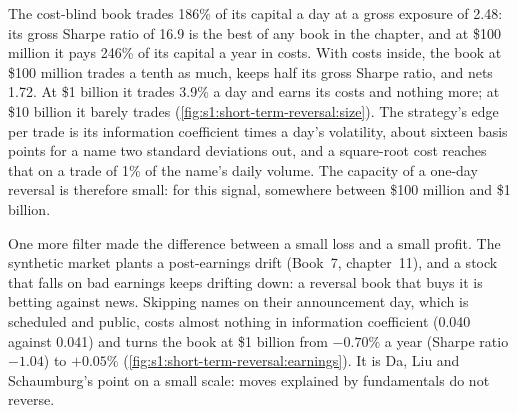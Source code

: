 The cost-blind book trades 186\% of its capital a day at a gross exposure of 2.48: its gross Sharpe ratio of 16.9 is the best of any book in the chapter, and
at \$100 million it pays 246\% of its capital a year in costs. With costs inside, the book at \$100 million trades a tenth as much, keeps half its gross
Sharpe ratio, and nets 1.72. At \$1 billion it trades 3.9\% a day and earns its costs and nothing more; at \$10 billion it barely trades
(\cref{fig:s1:short-term-reversal:size}). The strategy's edge per trade is its information coefficient times a day's volatility, about sixteen basis
points for a name two standard deviations out, and a square-root cost reaches that on a trade of 1\% of the name's daily volume. The capacity of a one-day
reversal is therefore small: for this signal, somewhere between \$100 million and \$1 billion.

\begin{omfigure}

\label{fig:s1:short-term-reversal:size}
\end{omfigure}

One more filter made the difference between a small loss and a small profit. The synthetic market plants a post-earnings drift (Book~7, chapter~11), and a
stock that falls on bad earnings keeps drifting down: a reversal book that buys it is betting against news. Skipping names on their announcement day, which
is scheduled and public, costs almost nothing in information coefficient (0.040 against 0.041) and turns the book at \$1 billion from $-0.70\%$ a year
(Sharpe ratio $-1.04$) to $+0.05\%$ (\cref{fig:s1:short-term-reversal:earnings}). It is Da, Liu and Schaumburg's point on a small scale: moves explained by
fundamentals do not reverse.

